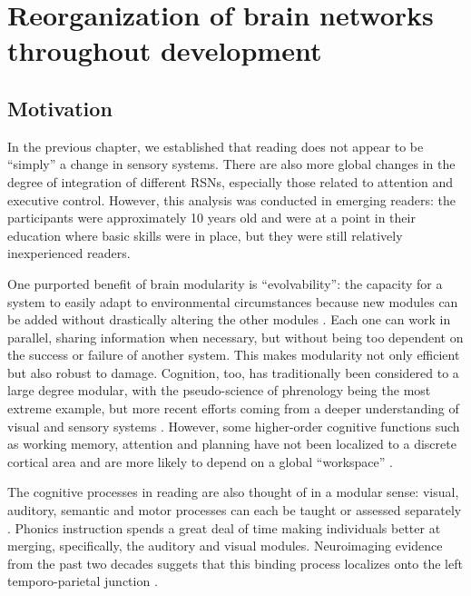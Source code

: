 \chapter{Reorganization of brain networks throughout development}

\section{Motivation}

In the previous chapter, we established that reading does not appear to be ``simply'' a change in sensory systems. There are also more global changes in the degree of integration of different RSNs, especially those related to attention and executive control. However, this analysis was conducted in emerging readers: the participants were approximately 10 years old and were at a point in their education where basic skills were in place, but they were still relatively inexperienced readers.

One purported benefit of brain modularity is ``evolvability'': the capacity for a system to easily adapt to environmental circumstances because new modules can be added without drastically altering the other modules \citep{Kashton2005}. Each one can work in parallel, sharing information when necessary, but without being too dependent on the success or failure of another system. This makes modularity not only efficient but also robust to damage. Cognition, too, has traditionally been considered to a large degree modular, with the pseudo-science of phrenology being the most extreme example, but more recent efforts coming from a deeper understanding of visual and sensory systems \citep{Barrett2006}. However, some higher-order cognitive functions such as working memory, attention and planning have not been localized to a discrete cortical area and are more likely to depend on a global ``workspace'' \citep{Dahaene1998}.

The cognitive processes in reading are also thought of in a modular sense: visual, auditory, semantic and motor processes can each be taught or assessed separately \citep{Cutting2009a}. Phonics instruction spends a great deal of time making individuals better at merging, specifically, the auditory and visual modules. Neuroimaging evidence from the past two decades suggets that this binding process localizes onto the left temporo-parietal junction \citep{}. 

